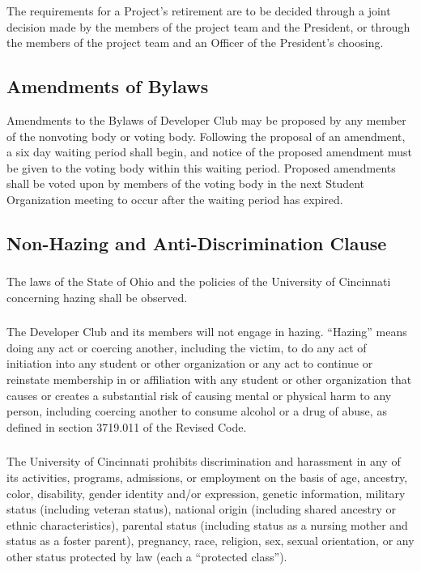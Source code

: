\documentclass{article}
\newcommand{\clubName}{Developer Club\xspace}
\newcommand{\votingBody}{voting body\xspace}
\newcommand{\nonvotingBody}{nonvoting body\xspace}
\newcommand{\meeting}{Student Organization meeting\xspace}
\let\section\subsection
\let\subsection\subsubsection
\begin{document}
\subsection{}

The requirements for a Project's retirement are to be decided through a joint decision made by the members of the project team and the President, or through the members of the project team and an Officer of the President's choosing.

\section{Amendments of Bylaws}

Amendments to the Bylaws of \clubName may be proposed by any member of the \nonvotingBody or \votingBody. Following the proposal of an amendment, a six day waiting period shall begin, and notice of the proposed amendment must be given to the \votingBody within this waiting period. Proposed amendments shall be voted upon by members of the \votingBody in the next \meeting to occur after the waiting period has expired. 

\section{Non-Hazing and Anti-Discrimination Clause}

\subsection{}
The laws of the State of Ohio and the policies of the University of Cincinnati concerning hazing shall be observed.

\subsection{}
The \clubName and its members will not engage in hazing. ``Hazing'' means doing any act or coercing another, including the victim, to do any act of initiation into any student or other organization or any act to continue or reinstate membership in or affiliation with any student or other organization that causes or creates a substantial risk of causing mental or physical harm to any person, including coercing another to consume alcohol or a drug of abuse, as defined in section 3719.011 of the Revised Code.

\subsection{}
The University of Cincinnati prohibits discrimination and harassment in any of its  activities, programs, admissions, or employment on the basis of age, ancestry, color, disability,  gender identity and/or expression, genetic information, military status (including veteran status),  national origin (including shared ancestry or ethnic characteristics), parental status (including  status as a nursing mother and status as a foster parent), pregnancy, race, religion, sex, sexual  orientation, or any other status protected by law (each a ``protected class'').
\end{document}
